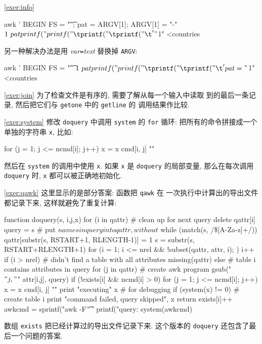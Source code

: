 \myexer\ref{exer:info}
\begin{awkcode}
    awk '
    BEGIN { FS = "\t"; pat = ARGV[1]; ARGV[1] = "-" }
    $1 ~ pat {
        printf("%
        printf("\t%
        printf("\t%
        printf("\t%
    }
    ' "$1" <countries
\end{awkcode}
另一种解决办法是用 \textit{var}\texttt{=}\textit{text} 替换掉
\texttt{ARGV}:
\begin{awkcode}
    awk '
    BEGIN { FS = "\t" }
    $1 ~ pat {
        printf("%
        printf("\t%
        printf("\t%
        printf("\t%
    }
    ' pat="$1" <countries
\end{awkcode}

\myexer\ref{exer:join} 为了检查文件是有序的, 需要了解从每一个输入中读取
到的最后一条记录, 然后把它们与 \texttt{getone} 中的 \texttt{getline} 的
调用结果作比较.

\myexer\ref{exer:system} 修改 \texttt{doquery} 中调用 \texttt{system}
的 \texttt{for} 循环: 把所有的命令拼接成一个单独的字符串 \texttt{x},
比如:
\begin{awkcode}
    for (j = 1; j <= ncmd[i]; j++) x = x cmd[i, j] "\n"
\end{awkcode}
然后在 \texttt{system} 的调用中使用 \texttt{x}. 如果 \texttt{x} 是 
\texttt{doquery} 的局部变量, 那么在每次调用 \texttt{doquery} 时, 
\texttt{x} 都可以被正确地初始化.

\myexer\ref{exer:qawk} 这里显示的是部分答案: 函数把 \texttt{qawk} 在
一次执行中计算出的导出文件都记录下来, 这样就避免了重复计算:
\begin{awkcode}
    function doquery(s,   i,j,x) {
        for (i in qattr)  # clean up for next query
            delete qattr[i]
        query = s    # put $names in query into qattr, without $
        while (match(s, /\$[A-Za-z]+/)) {
            qattr[substr(s, RSTART+1, RLENGTH-1)] = 1
            s = substr(s, RSTART+RLENGTH+1)
        }
        for (i = 1; i <= nrel && !subset(qattr, attr, i); ) 
            i++
        if (i > nrel)     # didn't find a table with all attributes
            missing(qattr)
        else {            # table i contains attributes in query
            for (j in qattr)   # create awk program
                gsub("\\$" j, "$" attr[i,j], query)
            if (!exists[i] && ncmd[i] > 0) {
                for (j = 1; j <= ncmd[i]; j++)
                    x = x cmd[i, j] "\n"
                print "executing\n" x  # for debugging
                if (system(x) != 0) { # create table i
                        print "command failed, query skipped\n", x
                        return
                   }
                exists[i]++
            }
            awkcmd = sprintf("awk -F'\t' '%
            printf("query: %
            system(awkcmd)
        }
    }
\end{awkcode}
数组 \texttt{exists} 把已经计算过的导出文件记录下来. 这个版本的
\texttt{doquery} 还包含了最后一个问题的答案.

